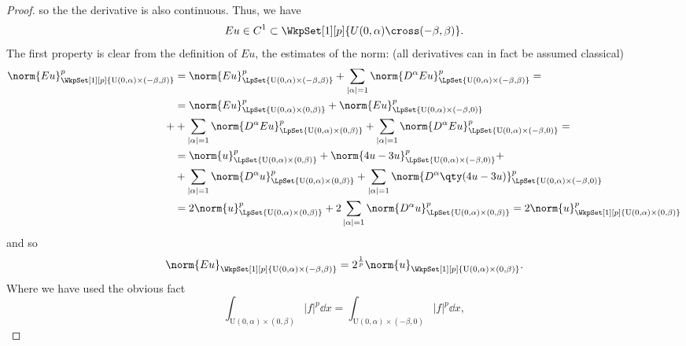 \begin{proof}
	so the the derivative is also continuous. Thus, we have
	\[
		Eu  \in C^1 \subset \WkpSet[1][p]{U(0,\alpha) \cross (-\beta,\beta)}.
	\]
	The first property is clear from the definition of $Eu$, the estimates of the norm: (all derivatives can in fact be assumed classical)
	\begin{align*}
		\norm{Eu}_{\WkpSet[1][p]{\text{U}(0,\alpha) \times (-\beta,\beta)}}^p &= \norm{Eu}_{\LpSet{\text{U}(0,\alpha)\times (-\beta,\beta)}}^p + \sum_{|\alpha| = 1}\norm{D^{\alpha}Eu}_{\LpSet{\text{U}(0,\alpha)\times (-\beta, \beta)}}^p = \\
		&= \norm{Eu}_{\LpSet{\text{U}(0,\alpha) \times (0,\beta)}}^p +\norm{Eu}_{\LpSet{\text{U}(0,\alpha) \times (-\beta,0)}}^p \\ +
		& + \sum_{|\alpha| = 1}\norm{D^{\alpha}Eu}_{\LpSet{\text{U}(0,\alpha)\times (0, \beta)}}^p + \sum_{|\alpha| = 1}\norm{D^{\alpha}Eu}_{\LpSet{\text{U}(0,\alpha)\times (-\beta, 0)}}^p = \\
		& = \norm{u}_{\LpSet{\text{U}(0,\alpha)\times (0,\beta)}}^p + \norm{4u - 3u}_{\LpSet{\text{U}(0,\alpha)\times (-\beta, 0)}}^p + \\
		& + \sum_{|\alpha| = 1}\norm{D^{\alpha}u}_{\LpSet{\text{U}(0,\alpha)\times (0,\beta)}}^p + \sum_{|\alpha| =1}\norm{D^{\alpha}\qty(4u - 3u)}_{\LpSet{\text{U}(0,\alpha)\times (-\beta,0)}}^p \\
		&= 2 \norm{u}_{\LpSet{\text{U}(0,\alpha)\times (0,\beta)}}^p + 2 \sum_{|\alpha| =1}\norm{D^{\alpha}u}_{\LpSet{\text{U}(0,\alpha)\times (0,\beta)}}^p = 2 \norm{u}_{\WkpSet[1][p]{\text{U}(0,\alpha)\times (0,\beta)}}^p
	\end{align*}
	and so
	\[
		\norm{Eu}_{\WkpSet[1][p]{\text{U}(0,\alpha)\times (-\beta,\beta)}} = 2^{\frac{1}{p}} \norm{u}_{\WkpSet[1][p]{\text{U}(0,\alpha)\times (0,\beta)}}.
	\]
	Where we have used the obvious fact
	\[
		\int_{\text{U}(0,\alpha)\times (0,\beta)}|f|^p\dd{x} = \int_{\text{U}(0,\alpha)\times (-\beta,0)}|f|^p\dd{x},
	\]


\end{proof}
